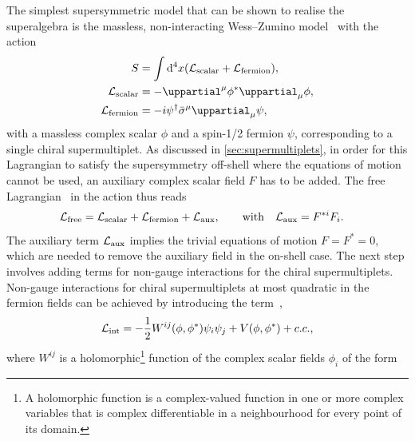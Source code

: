 The simplest supersymmetric model that can be shown to realise the superalgebra is the massless, non-interacting Wess--Zumino model~\cite{Wess:1974tw} with the action~\cite{Bustamante:2009us,Martin:1997ns} 
\begin{equation}
\begin{split}
S & = \int \diff^4x(\Lagr_\mathrm{scalar} + \Lagr_\mathrm{fermion}), \\
	\Lagr_\mathrm{scalar} & = - \uppartial^\mu\phi^*\uppartial_\mu\phi, \\
	\Lagr_\mathrm{fermion} & = - i\psi^\dagger\bar{\sigma}^\mu\uppartial_\mu\psi , \\
	\label{eq:wess_zumino_free}
\end{split}
\end{equation}
with a massless complex scalar $\phi$ and a spin-1/2 fermion $\psi$, corresponding to a single chiral supermultiplet. As discussed in \cref{sec:supermultiplets}, in order for this Lagrangian to satisfy the supersymmetry off-shell where the equations of motion cannot be used, an auxiliary complex scalar field $F$ has to be added. The free Lagrangian~\cite{Bustamante:2009us} in the action thus reads
\begin{equation}
\begin{split}
	\mathcal{L}_\mathrm{free} & = \mathcal{L}_\mathrm{scalar} + \mathcal{L}_\mathrm{fermion} + \mathcal{L}_\mathrm{aux},  \qquad \mathrm{with} \quad \mathcal{L}_\mathrm{aux} = F^{*i}F_i.
\end{split}
\label{eq:free_wess_zumino}
\end{equation} 
The auxiliary term $\mathcal{L}_\mathrm{aux}$ implies the trivial equations of motion $F = F^* = 0$, which are needed to remove the auxiliary field in the on-shell case. The next step involves adding terms for non-gauge interactions for the chiral supermultiplets. Non-gauge interactions for chiral supermultiplets at most quadratic in the fermion fields can be achieved by introducing the term~\cite{Bustamante:2009us},
\begin{equation}
	\mathcal{L}_\mathrm{int} = - \frac{1}{2}W^{ij}(\phi,\phi^*)\psi_i \psi_j + V(\phi,\phi^*) + c.c.,
	\label{eq:wess_zumino_int}
\end{equation}
where $W^{ij}$ is a holomorphic\footnote{A holomorphic function is a complex-valued function in one or more complex variables that is complex differentiable in a neighbourhood for every point of its domain.} function of the complex scalar fields $\phi_i$ of the form~\cite{Bustamante:2009us}
